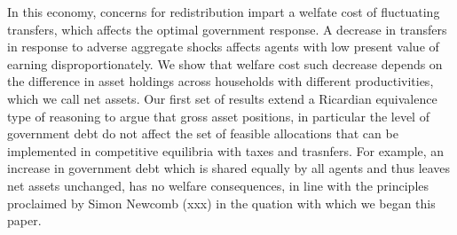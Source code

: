\documentclass[thmsb,11pt]{article}
\begin{document}
In this economy, concerns for redistribution impart a welfate cost of fluctuating transfers, which affects the optimal government response. A decrease in transfers in response to adverse aggregate shocks affects agents with low present value of earning disproportionately. We show that welfare cost such decrease depends on the difference in asset holdings across households with different productivities, which we call net assets. Our first set of results extend a Ricardian equivalence type of reasoning to argue that gross asset positions, in particular the level of government debt do not affect the set of feasible allocations that can be implemented in competitive equilibria with taxes and trasnfers. For example, an increase in government debt which is shared equally by all agents and thus leaves net assets unchanged,  has no welfare consequences, in line with the principles proclaimed by Simon Newcomb (xxx) in the quation with which we began this paper.


\end{document}
